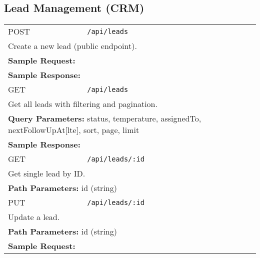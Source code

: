 \documentclass[11pt,a4paper]{article}
\begin{document}
\subsection{Lead Management (CRM)}
\begin{longtable}{p{2.5cm}p{10cm}}
POST & \texttt{/api/leads} \\
\multicolumn{2}{p{13cm}}{Create a new lead (public endpoint).} \\
\multicolumn{2}{p{13cm}}{\textbf{Sample Request:}}
\begin{lstlisting}[language=json]
{"coachId":"64f1a2b3c4d5e6f7a8b9c0d1","funnelId":"64f1a2b3c4d5e6f7a8b9c0d2","name":"Jane","email":"jane@ex.com","phone":"+11234567890","source":"Web Form"}
\end{lstlisting} \\
\multicolumn{2}{p{13cm}}{\textbf{Sample Response:}}
\begin{lstlisting}[language=json]
{"success": true, "data": {"id": "64f1a2b3c4d5e6f7a8b9c0d3", "name": "Jane", "email": "jane@ex.com"}}
\end{lstlisting} \\
GET & \texttt{/api/leads} \\
\multicolumn{2}{p{13cm}}{Get all leads with filtering and pagination.} \\
\multicolumn{2}{p{13cm}}{\textbf{Query Parameters:} status, temperature, assignedTo, nextFollowUpAt[lte], sort, page, limit} \\
\multicolumn{2}{p{13cm}}{\textbf{Sample Response:}}
\begin{lstlisting}[language=json]
{"success": true, "count": 25, "total": 100, "pagination": {}, "data": [{"id": "64f1a2b3c4d5e6f7a8b9c0d3", "name": "Jane"}]}
\end{lstlisting} \\
GET & \texttt{/api/leads/:id} \\
\multicolumn{2}{p{13cm}}{Get single lead by ID.} \\
\multicolumn{2}{p{13cm}}{\textbf{Path Parameters:} id (string)} \\
PUT & \texttt{/api/leads/:id} \\
\multicolumn{2}{p{13cm}}{Update a lead.} \\
\multicolumn{2}{p{13cm}}{\textbf{Path Parameters:} id (string)} \\
\multicolumn{2}{p{13cm}}{\textbf{Sample Request:}}
\begin{lstlisting}[language=json]
{"status":"Contacted","leadTemperature":"Hot"}
\end{lstlisting} \\

\end{longtable}
\end{document}
